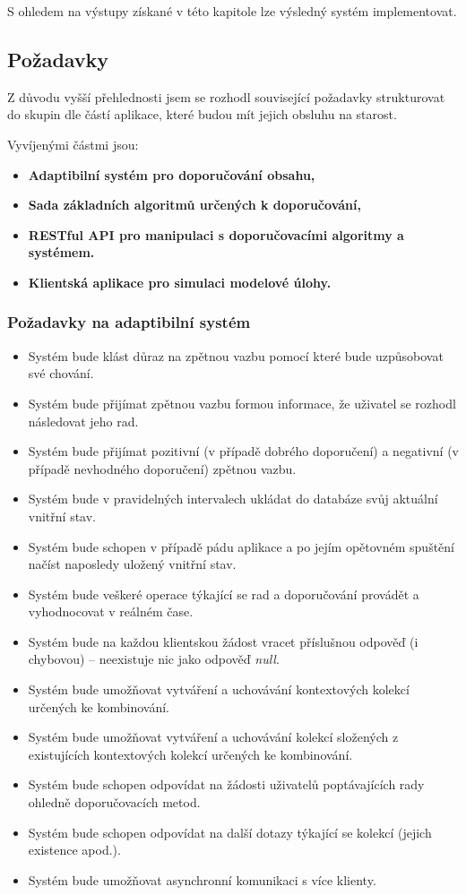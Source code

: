\documentclass[thesis=M,czech]{FITthesis}[2014/05/07]
\begin{document}
S ohledem na výstupy získané v této kapitole lze výsledný systém implementovat.

\subsection{Požadavky}
\label{sec:req}
Z důvodu vyšší přehlednosti jsem se rozhodl související požadavky strukturovat do skupin dle částí aplikace, které budou mít jejich obsluhu na starost.

Vyvíjenými částmi jsou:

\begin{itemize}
  \item \textbf{Adaptibilní systém pro doporučování obsahu,}
  \item \textbf{Sada základních algoritmů určených k doporučování,}
  \item \textbf{RESTful API pro manipulaci s doporučovacími algoritmy a systémem.}
  \item \textbf{Klientská aplikace pro simulaci modelové úlohy.}    
\end{itemize}

\subsubsection{Požadavky na adaptibilní systém}

\begin{itemize}
	\item Systém bude klást důraz na zpětnou vazbu pomocí které bude uzpůsobovat své chování.
	\item Systém bude přijímat zpětnou vazbu formou informace, že uživatel se rozhodl následovat jeho rad.
	\item Systém bude přijímat pozitivní (v případě dobrého doporučení) a negativní (v případě nevhodného doporučení) zpětnou vazbu.
	\item Systém bude v pravidelných intervalech ukládat do databáze svůj aktuální vnitřní stav.
	\item Systém bude schopen v případě pádu aplikace a po jejím opětovném spuštění načíst naposledy uložený vnitřní stav.
	\item Systém bude veškeré operace týkající se rad a doporučování provádět a vyhodnocovat v reálném čase.
	\item Systém bude na každou klientskou žádost vracet příslušnou odpověď (i chybovou) – neexistuje nic jako odpověď \emph{null}.	
	\item Systém bude umožňovat vytváření a uchovávání kontextových kolekcí určených ke kombinování.
	\item Systém bude umožňovat vytváření a uchovávání kolekcí složených z existujících kontextových kolekcí určených ke kombinování.	
	\item Systém bude schopen odpovídat na žádosti uživatelů poptávajících rady ohledně doporučovacích metod.
	\item Systém bude schopen odpovídat na další dotazy týkající se kolekcí (jejich existence apod.).	
	\item Systém bude umožňovat asynchronní komunikaci s více klienty.
\end{itemize}
\end{document}
